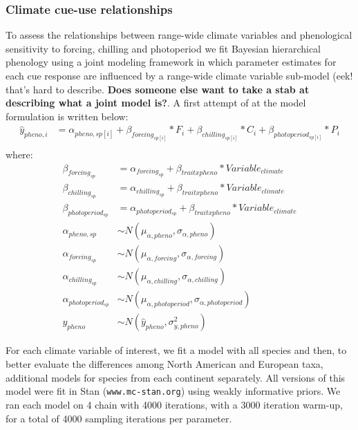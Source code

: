 \documentclass[12pt]{article}\usepackage[]{graphicx}\usepackage[]{color}
\begin{document}
\subsubsection*{Climate cue-use relationships}
To assess the relationships between range-wide climate variables and phenological sensitivity to forcing, chilling and photoperiod we fit Bayesian hierarchical phenology using a joint modeling framework in which parameter estimates for each cue response are influenced by a range-wide climate variable sub-model (eek! that's hard to describe. \textbf{Does someone else want to take a stab at describing what a joint model is?}. A first attempt of at the model formulation is written below:\\

\begin{align*}
\hat{y}_{pheno, i} &= \alpha_{pheno, sp[i]} + \beta_{forcing_{sp[i]}}*F_i+\beta_{chilling_{sp[i]}}*C_i+\beta_{photoperiod_{sp[i]}}*P_i \\
\end{align*}
where:\\
\begin{align*}

\beta_{forcing_{sp}} & = \alpha_{forcing_{sp}} + \beta_{trait x pheno}*Variable_{climate} \\
\beta_{chilling_{sp}} & = \alpha_{chilling_{sp}} + \beta_{trait x pheno}*Variable_{climate} \\
\beta_{photoperiod_{sp}} & = \alpha_{photoperiod_{sp}} + \beta_{trait x pheno}*Variable_{climate} \\
\alpha_{pheno, sp} & \sim N(\mu_{\alpha, pheno}, \sigma_{\alpha, pheno}) \\
\alpha_{forcing_{sp}} & \sim N(\mu_{\alpha, forcing}, \sigma_{\alpha, forcing})\\
\alpha_{chilling_{sp}} & \sim N(\mu_{\alpha, chilling}, \sigma_{\alpha, chilling})\\
\alpha_{photoperiod_{sp}} & \sim N(\mu_{\alpha, photoperiod}, \sigma_{\alpha, photoperiod})\\
y_{pheno} & \sim N(\hat{y}_{pheno},\sigma^2_{y, pheno}) 

\end{align*}

For each climate variable of interest, we fit a model with all species and then, to better evaluate the differences among North American and European taxa, additional models for species from each continent separately. All versions of this model were fit in Stan \citep{Carpenter2017}(\texttt{www.mc-stan.org}) using weakly informative priors. We ran each model on 4 chain with 4000 iterations, with a 3000 iteration warm-up, for a total of 4000 sampling iterations per parameter. 
\end{document}
